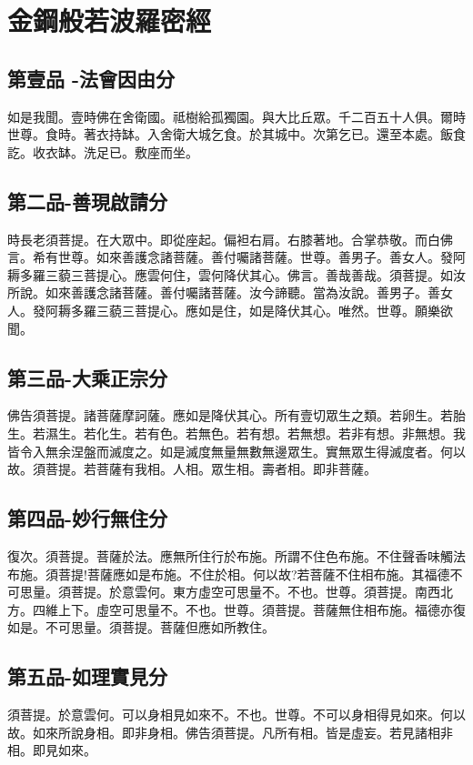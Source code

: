 \documentclass[a6paper, 22pt, twocolumn]{cvertbook}
\begin{document}
\inmain
\part[金鋼般若波羅密經]{金鋼般若波羅密經\hspace{3em}{\normalsize 姚秦三藏法師鳩摩羅什譯}}

\chapter{第壹品 -法會因由分}
\large 如是我聞。壹時佛在舍衛國。祗樹給孤獨園。與大比丘眾。千二百五十人俱。爾時世尊。食時。著衣持缽。入舍衛大城乞食。於其城中。次第乞已。還至本處。飯食訖。收衣缽。洗足已。敷座而坐。
\chapter{第二品-善現啟請分}
\large 時長老須菩提。在大眾中。即從座起。偏袒右肩。右膝著地。合掌恭敬。而白佛言。希有世尊。如來善護念諸菩薩。善付囑諸菩薩。世尊。善男子。善女人。發阿耨多羅三藐三菩提心。應雲何住，雲何降伏其心。佛言。善哉善哉。須菩提。如汝所說。如來善護念諸菩薩。善付囑諸菩薩。汝今諦聽。當為汝說。善男子。善女人。發阿耨多羅三藐三菩提心。應如是住，如是降伏其心。唯然。世尊。願樂欲聞。
\chapter{第三品-大乘正宗分}
\large 佛告須菩提。諸菩薩摩訶薩。應如是降伏其心。所有壹切眾生之類。若卵生。若胎生。若濕生。若化生。若有色。若無色。若有想。若無想。若非有想。非無想。我皆令入無余涅盤而滅度之。如是滅度無量無數無邊眾生。實無眾生得滅度者。何以故。須菩提。若菩薩有我相。人相。眾生相。壽者相。即非菩薩。
\chapter{第四品-妙行無住分}
\large 復次。須菩提。菩薩於法。應無所住行於布施。所謂不住色布施。不住聲香味觸法布施。須菩提!菩薩應如是布施。不住於相。何以故?若菩薩不住相布施。其福德不可思量。須菩提。於意雲何。東方虛空可思量不。不也。世尊。須菩提。南西北方。四維上下。虛空可思量不。不也。世尊。須菩提。菩薩無住相布施。福德亦復如是。不可思量。須菩提。菩薩但應如所教住。
\chapter{第五品-如理實見分}
\large 須菩提。於意雲何。可以身相見如來不。不也。世尊。不可以身相得見如來。何以故。如來所說身相。即非身相。佛告須菩提。凡所有相。皆是虛妄。若見諸相非相。即見如來。
\end{document}
